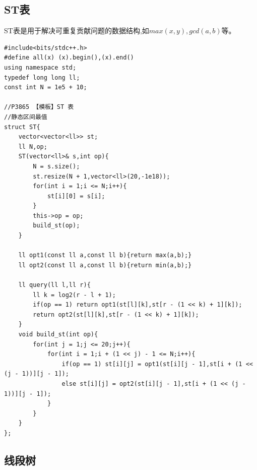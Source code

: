 \subsection{ST表}
ST表是用于解决可重复贡献问题的数据结构,如$max(x,y),gcd(a,b)$等。
\begin{lstlisting}[caption={}]
#include<bits/stdc++.h>
#define all(x) (x).begin(),(x).end()
using namespace std;
typedef long long ll;
const int N = 1e5 + 10;

//P3865 【模板】ST 表
//静态区间最值
struct ST{
	vector<vector<ll>> st;
	ll N,op;
	ST(vector<ll>& s,int op){
		N = s.size();
		st.resize(N + 1,vector<ll>(20,-1e18));
		for(int i = 1;i <= N;i++){
			st[i][0] = s[i];
		}
		this->op = op;
		build_st(op);
	}

	ll opt1(const ll a,const ll b){return max(a,b);}
	ll opt2(const ll a,const ll b){return min(a,b);}

	ll query(ll l,ll r){
		ll k = log2(r - l + 1); 
		if(op == 1) return opt1(st[l][k],st[r - (1 << k) + 1][k]); 
		return opt2(st[l][k],st[r - (1 << k) + 1][k]); 
	}
	void build_st(int op){
		for(int j = 1;j <= 20;j++){
			for(int i = 1;i + (1 << j) - 1 <= N;i++){
				if(op == 1) st[i][j] = opt1(st[i][j - 1],st[i + (1 << (j - 1))][j - 1]);
				else st[i][j] = opt2(st[i][j - 1],st[i + (1 << (j - 1))][j - 1]);
			}
		}
	}
};
\end{lstlisting}

\subsection{线段树}
